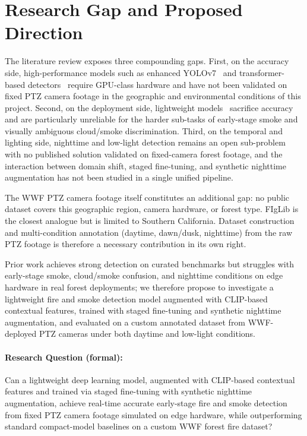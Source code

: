 \documentclass[11pt,twocolumn]{article}
\begin{document}
\section{Research Gap and Proposed Direction}
\label{sec:gap}

The literature review exposes three compounding gaps. First, on the
accuracy side, high-performance models such as enhanced
YOLOv7~\cite{kim2023} and transformer-based
detectors~\cite{wildfire2023} require GPU-class hardware and have
not been validated on fixed PTZ camera footage in the geographic and
environmental conditions of this project. Second, on the deployment
side, lightweight models~\cite{firenet2019, kd2025} sacrifice
accuracy and are particularly unreliable for the harder sub-tasks
of early-stage smoke and visually ambiguous cloud/smoke
discrimination. Third, on the temporal and lighting side, nighttime
and low-light detection remains an open sub-problem with no published
solution validated on fixed-camera forest footage, and the interaction
between domain shift, staged fine-tuning, and synthetic nighttime
augmentation has not been studied in a single unified pipeline.

The WWF PTZ camera footage itself constitutes an additional gap:
no public dataset covers this geographic region, camera hardware,
or forest type. FIgLib is the closest analogue but is limited to
Southern California. Dataset construction and multi-condition
annotation (daytime, dawn/dusk, nighttime) from the raw PTZ footage
is therefore a necessary contribution in its own right.

Prior work achieves strong detection on curated benchmarks but
struggles with early-stage smoke, cloud/smoke confusion, and
nighttime conditions on edge hardware in real forest deployments;
we therefore propose to investigate a lightweight fire and smoke
detection model augmented with CLIP-based contextual features,
trained with staged fine-tuning and synthetic nighttime augmentation,
and evaluated on a custom annotated dataset from WWF-deployed PTZ
cameras under both daytime and low-light conditions.

\paragraph{Research Question (formal):}
Can a lightweight deep learning model, augmented with CLIP-based
contextual features and trained via staged fine-tuning with synthetic
nighttime augmentation, achieve real-time accurate early-stage fire
and smoke detection from fixed PTZ camera footage simulated on edge hardware, while outperforming standard compact-model
baselines on a custom WWF forest fire dataset?
\end{document}
